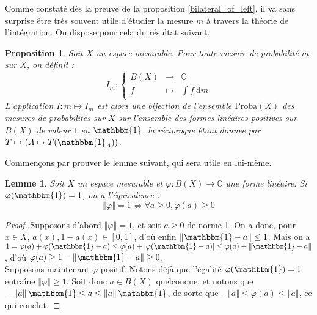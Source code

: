 \documentclass[a4paper,12pt]{article}
\newtheorem{proposition}[theorem]{Proposition}
\newtheorem{lemma}[theorem]{Lemme}
\newcommand{\C}{\mathbb{C}}
\newcommand{\norm}[1]{\left\Vert #1\right\Vert}
\newcommand{\abs}[1]{\left\vert#1\right\vert}
\newcommand{\indic}{\mathbbm{1}}
\newcommand{\integral}[4]{\int_{#1}^{#2} #3~\mathrm{d}#4}
\newcommand\fundef[3]{#1: \left\{\begin{array}{ccc}#2\\#3\end{array}\right.}
\renewcommand{\iff}{\Leftrightarrow}
\begin{document}
Comme constaté dès la preuve de la proposition \ref{bilateral_of_left}, il va sans surprise être très souvent utile d'étudier la mesure $m$ à travers la théorie de l'intégration.
On dispose pour cela du résultat suivant.
\begin{proposition}\label{repr}
    Soit $X$ un espace mesurable. Pour toute mesure de probabilité $m$ sur $X$, on définit :
    \begin{equation*}
        \fundef{I_m}{B(X)&\to&\C}{f&\mapsto&\integral{}{}{f}{m}}
    \end{equation*}
    L'application $I:m\mapsto I_m$ est alors une bijection de l'ensemble $\mathrm{Proba}(X)$ des mesures de
    probabilités sur $X$ sur l'ensemble des formes linéaires positives sur $B(X)$ de valeur $1$ en $\indic$, la 
    réciproque étant donnée par $T\mapsto(A\mapsto T(\indic_A))$.
\end{proposition}

Commençons par prouver le lemme suivant, qui sera utile en lui-même.

\begin{lemma}\label{positive_iff_norm}
    Soit $X$ un espace mesurable et $\varphi:B(X)\to\C$ une forme linéaire. 
    Si $\varphi(\indic) = 1$, on a l'équivalence :
    \begin{equation*}
        \norm{\varphi} = 1 \iff \forall a \ge 0, \varphi(a) \geq 0
    \end{equation*}
\end{lemma}

\begin{proof}
    Supposons d'abord $\norm{\varphi} = 1$, et soit $a\ge 0$ de norme 1. On a donc, pour $x\in X$, $a(x), 1-a(x)\in[0,1]$,
    d'où enfin $\norm{\indic-a}\le 1$. Mais on a $1 = \varphi(a) + \varphi(\indic-a) \le \varphi(a) + \abs{\varphi(\indic-a)} \le \varphi(a) + \norm{\indic - a}$, d'où
    $\varphi(a)\ge 1 - \norm{\indic-a}\ge0$. \\
    Supposons maintenant $\varphi$ positif. Notons déjà que l'égalité $\varphi(\indic) = 1$ entraîne $\norm{\varphi}\ge1$. Soit donc $a\in B(X)$ quelconque,
    et notons que $-\norm{a}\indic\le a\le\norm{a}\indic$, de sorte que $-\norm{a}\le\varphi(a)\le\norm{a}$, ce qui conclut.
\end{proof}
\end{document}
